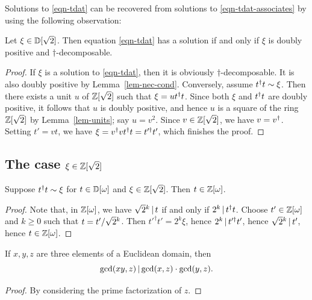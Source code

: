 Solutions to {\eqref{eqn-tdat}} can be recovered from solutions to
{\eqref{eqn-tdat-associates}} by using the following observation:

\begin{lemma}\label{lem-sim}
  Let $\xi\in{\mathbb{D}}[\sqrt2]$. Then equation {\eqref{eqn-tdat}} has a
  solution if and only if $\xi$ is doubly positive and
  $\dagger$-decomposable.
\end{lemma}

\begin{proof}
  If $\xi$ is a solution to {\eqref{eqn-tdat}}, then it is obviously
  $\dagger$-decomposable. It is also doubly positive by
  Lemma~\ref{lem-nec-cond}. Conversely, assume $t^{\dagger} t\sim
  \xi$. Then there exists a unit $u$ of $\mathbb{Z}[\sqrt2]$ such that
  $\xi=ut^{\dagger} t$. Since both $\xi$ and $t^{\dagger} t$ are doubly positive, it
  follows that $u$ is doubly positive, and hence $u$ is a square of
  the ring $\mathbb{Z}[\sqrt2]$ by Lemma~\ref{lem-units}; say $u=v^2$. Since
  $v\in\mathbb{Z}[\sqrt2]$, we have $v=v^{\dagger}$. Setting $t'=vt$, we have
  $\xi=v^{\dagger} vt^{\dagger} t = t'^{\dagger}t'$, which finishes the proof.
\end{proof}

\subsection[{The case xi in Z[root 2]}]
{The case $\xi\in\mathbb{Z}[\sqrt 2]$}

\begin{lemma}\label{lem-zomega-domega}
  Suppose $t^{\dagger} t\sim \xi$ for $t\in{\mathbb{D}}[\omega]$ and $\xi\in\mathbb{Z}[\sqrt
  2]$. Then $t\in\mathbb{Z}[\omega]$. 
\end{lemma}

\begin{proof}
  Note that, in $\mathbb{Z}[\omega]$, we have $\sqrt{2}{}^{k}\mathop{|}\nolimits t$ if and only
  if $2^k\mathop{|}\nolimits t^{\dagger} t$. Choose $t'\in\mathbb{Z}[\omega]$ and $k\geq 0$ such
  that $t=t'/\sqrt{2}{}^{k}$. Then $t'^{\dagger}t' = 2^k\xi$, hence
  $2^k\mathop{|}\nolimits t'^{\dagger}t'$, hence $\sqrt{2}{}^{k}\mathop{|}\nolimits t'$, hence
  $t\in\mathbb{Z}[\omega]$. 
\end{proof}

\begin{lemma}\label{lem-gcd}
  If $x,y,z$ are three elements of a Euclidean domain, then
  \[\gcd(xy,z)\mathop{|}\nolimits \gcd(x,z)\cdot\gcd(y,z).
  \]
\end{lemma}

\begin{proof}
  By considering the prime factorization of $z$. 
\end{proof}

